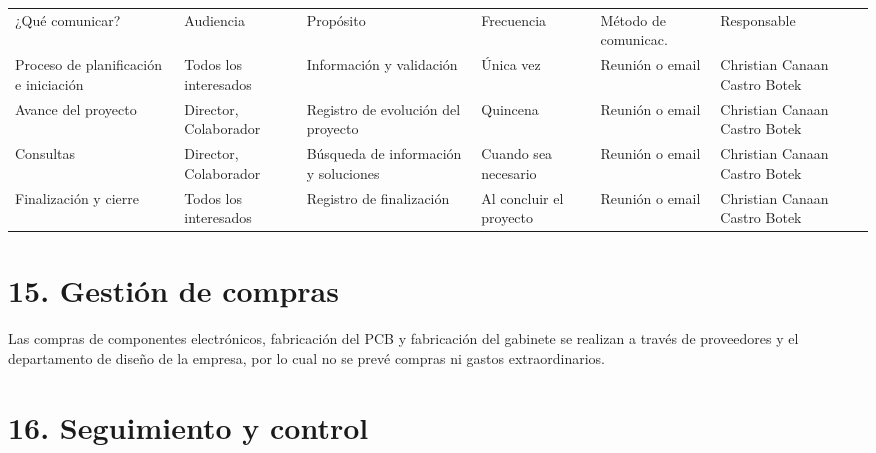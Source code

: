 \documentclass[11pt]{charter}
\begin{document}
\begin{table}[htpb]
\centering
\begin{tabularx}{\linewidth}{|X|C{1.8cm}|C{3cm}|C{1.8cm}|C{2cm}|C{2.1cm}|}
\hline
{} 
           \\ \hline
{} 
¿Qué comunicar? & Audiencia & Propósito & Frecuencia & Método de comunicac. & Responsable \\ \hline
Proceso de planificación e iniciación  & Todos los interesados & Información y validación & Única vez & Reunión o email & Christian Canaan Castro Botek            \\ \hline
Avance del proyecto & Director, Colaborador & Registro de evolución del proyecto    & Quincena    & Reunión o email   & Christian Canaan Castro Botek             \\ \hline
Consultas  & Director, Colaborador & Búsqueda de información y soluciones         &  Cuando sea necesario  &  Reunión o email  & Christian Canaan Castro Botek            \\ \hline
Finalización y cierre & Todos los interesados   & Registro de finalización        & Al concluir el proyecto  &  Reunión o email & Christian Canaan Castro Botek            \\ \hline

\end{tabularx}
\end{table}

\section{15. Gestión de compras}
\label{sec:compras}

Las compras de componentes electrónicos, fabricación del PCB y fabricación del gabinete se realizan a través de proveedores y el departamento de diseño de la empresa, por lo cual no se prevé compras ni gastos extraordinarios.

\vspace{290px}
 

\section{16. Seguimiento y control}
\label{sec:seguimiento}
\end{document}
